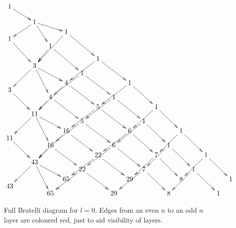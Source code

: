 \documentclass{article}
\newcommand{\ppm}[1]{\textcolor{red}{#1}}
\newcommand{\bajm}[1]{\textcolor{blue}{#1}}
\theoremstyle{definition}
\numberwithin{equation}{subsection}
\begin{document}
\begin{figure} 
\[
\xymatrix@R=-2pt@C=7pt{
1 \ar@[red][ddddrr] \\ \mbox{ } \vspace{.1in} \; \\ \\ \\ 
&& 1 \ar[dddll] \ar[ddrr] \ar[ddddr] \\ \\ 
 &&&& 1 \ar@[red][ddddddll] \ar@[red][dddddrr] \\
1 \ar@[red][dddddrr] \\
 &&& 1 \ar@[red][ddddl] \ar@[red][dddddrr] \\ \\ \\ 
 &&&&&&1 \ar[ddddrr] \ar[ddddll] \\
 &&3 \ar[ddddll] \ar[dddrr] \ar[dddddr] \\ 
 &&&&&1 \ar[ddddrr] \ar[ddddll] \\ \\ 
 &&&&4 \ar@[red][dddddll] \ar@[red][ddddrr] &&&& 1 \ar@[red][ddddrr] \ar@[red][ddddll] \\
 3 \ar@[red][ddddrr] \\
 &&& 4 \ar@[red][dddl] \ar@[red][ddddrr] &&&& 1 \ar@[red][ddddrr] \ar@[red][ddddll] \\ 
 \\ 
 &&&&&&5 \ar[ddddrr] \ar[ddddll] &&&& 1 \ar[ddddrr] \ar[ddddll] \\
&& 11 \ar[ddddll] \ar[dddrr] \ar[dddddr] \\  
&&&&& 5 \ar[ddddrr] \ar[ddddll] &&&& 1 \ar[ddddrr] \ar[ddddll] \\ 
\\ 
&&&& 16 \ar@[red][dddddll] \ar@[red][ddddrr] &&&& 6 \ar@[red][ddddrr] \ar@[red][ddddll] &&&& 1 \ar@[red][ddddrr] \ar@[red][ddddll] \\
11 \ar@[red][ddddrr] \\
&&& 16 \ar@[red][dddl] \ar@[red][ddddrr] &&&& 6 \ar@[red][ddddrr] \ar@[red][ddddll] &&&& 1 \ar@[red][ddddrr] \ar@[red][ddddll] \\ 
\\ 
 &&&&&& 22 \ar[ddddrr] \ar[ddddll] &&&& 7 \ar[ddddrr] \ar[ddddll] &&&& 1 \ar[ddddll] \ar[ddddrr] \\
&& 43 \ar[ddddll] \ar[dddrr] \ar[dddddr] \\  
&&&&&  22 \ar[ddddrr] \ar[ddddll] &&&& 7 \ar[ddddrr] \ar[ddddll] &&&& 1 \ar[ddddll] \ar[ddddrr] \\ 
\\ 
&&&& 65 &&&& 29 &&&& 8 &&&& 1 \\
43 \\
&&& 65 &&&& 29 &&&& 8 &&&& 1 \\
}
\]
\caption{ Full Bratelli diagram for $l=0$. Edges from an even $n$ to an odd $n$ layer are coloured red, just to aid visibility of layers. \label{fig:l=0Brat} }
\end{figure} 
\end{document}
